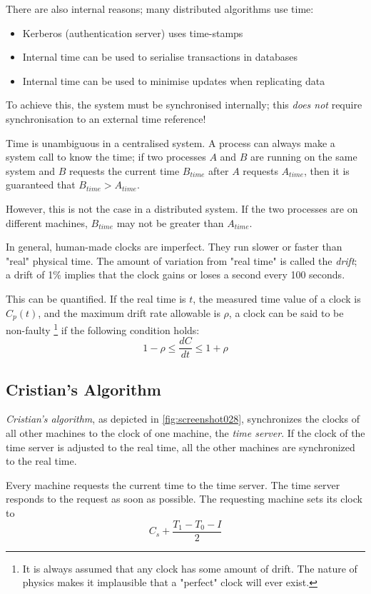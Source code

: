 There are also internal reasons; many distributed algorithms use time:
\begin{itemize}
\item Kerberos (authentication server) uses time-stamps 
\item Internal time can be used to serialise transactions in databases 
\item Internal time can be used to minimise updates when replicating data 
\end{itemize}
To achieve this, the system must be synchronised internally; this \textit{does not} require synchronisation to an external time reference!

Time is unambiguous in a centralised system. A process can always make a system call to know the time; if two processes $A$ and $B$ are running on the same system and $B$ requests the current time $B_{time}$ after $A$ requests $A_{time}$, then it is guaranteed that $B_{time} > A_{time}$.

However, this is not the case in a distributed system. If the two processes are on different machines, $B_{time}$ may not be greater than $A_{time}$.

In general, human-made clocks are imperfect. They run slower or faster than "real" physical time. The amount of variation from "real time" is called the \textit{drift}; a drift of 1\% implies that the clock gains or loses a second every 100 seconds.

This can be quantified. If the real time is $t$, the measured time value of a clock is $C_p(t)$, and the maximum drift rate allowable is $\rho$, a clock can be said to be non-faulty \footnote{It is always assumed that any clock has some amount of drift. The nature of physics makes it implausible that a "perfect" clock will ever exist.} if the following condition holds:
\[ 1 - \rho \le \frac{dC}{dt} \le 1 + \rho \]

\subsection{Cristian's Algorithm}
\textit{Cristian's algorithm}, as depicted in \autoref{fig:screenshot028}, synchronizes the clocks of all other machines to the clock of one machine, the \textit{time server}. If the clock of the time server is adjusted to the real time, all the other machines are synchronized to the real time.

Every machine requests the current time to the time server. The time server responds to the request as soon as possible. The requesting machine sets its clock to
\[ C_s + \frac{T_1 - T_0 - I}{2} \]

